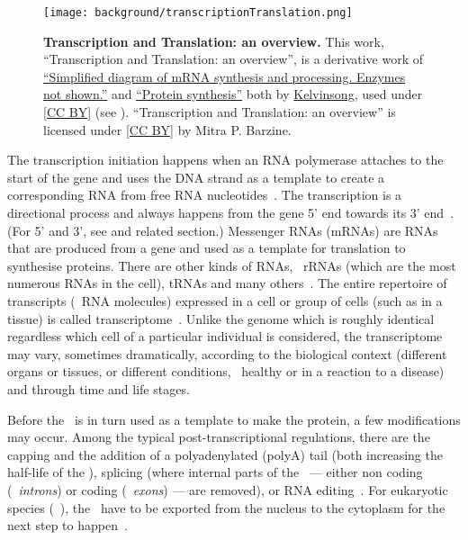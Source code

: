 \begin{figure}[!htpb]
    \vspace{-3mm}
    \texttt{[image: background/transcriptionTranslation.png]}\centering
    \vspace{-2.3mm}
    \caption[Transcription and Translation: an overview]%
    {\label{fig:transcriptionTranslation}\textbf{Transcription and Translation: an overview.}
    {\small This work, \enquote{Transcription and Translation: an overview},
    is a derivative work of
    \href{https://commons.wikimedia.org/wiki/File:MRNA.svg}{\enquote{Simplified diagram of mRNA synthesis and processing. Enzymes not shown.}}
    and
    \href{https://commons.wikimedia.org/wiki/File:Protein\_synthesis.svg}{\enquote{Protein synthesis}}
    both by \href{https://commons.wikimedia.org/wiki/User:Kelvinsong}{Kelvinsong},
    used under \href{https://creativecommons.org/licenses/by/3.0/}{[CC BY]}
    (see ).
    \enquote{Transcription and Translation: an overview} is licensed under
    \href{https://creativecommons.org/licenses/by/4.0/}{[CC BY]} by Mitra P. Barzine.
    }}
\end{figure}

The transcription initiation happens when
an \gls{RNA} polymerase attaches to the start of the gene
and uses the \gls{DNA} strand as a template
to create a corresponding \gls{RNA}
from free \gls{RNA} nucleotides~.
The transcription is a directional process and
always happens from the gene 5' end towards its 3' end~.
(For 5' and 3', see  and related section.)
Messenger \glspl{RNA} (\glspl{mRNA}) are \glspl{RNA} that are produced from a gene
and used as a template for translation to synthesise proteins.
There are other kinds of \glspl{RNA},
\eg\ \glspl{rRNA} (which are the most numerous \glspl{RNA} in the cell),
\glspl{tRNA} and many others~.
The entire repertoire of transcripts (\ie\ \gls{RNA} molecules) expressed
in a cell or group of cells (such as in a tissue)
is called transcriptome~.
Unlike the genome which is roughly identical
regardless which cell of a particular individual is considered,
the transcriptome may vary, sometimes dramatically,
according to the biological context (different organs or tissues,
or different conditions, \eg\ healthy or in a reaction to a disease)
and through time and life stages.~\mybr\

Before the \mRNA\ is in turn used as a template to make the protein,
a few modifications may occur.
Among the typical post-transcriptional regulations,
there are
the capping and the addition of a polyadenylated (polyA) tail
(both increasing the half-life of the \mRNA),
splicing
(where internal parts of the \mRNA\ ---
either non coding (\ie\ \emph{introns}) or coding (\ie\ \emph{exons}) --- are removed),
or \gls{RNA} editing~.
For eukaryotic species (\eg\ ),
the \mRNAs\ have to be exported
from the nucleus to the cytoplasm for the next step to happen~.\mybr\

